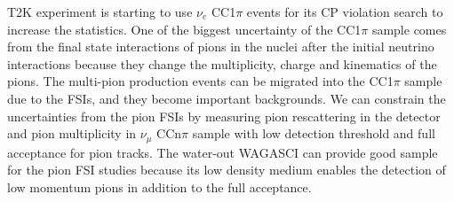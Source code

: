 T2K experiment is starting to use $\nu_{e}$ CC1$\pi$ events for its CP violation search to increase the statistics.
One of the biggest uncertainty of the CC1$\pi$ sample comes from the final state interactions of pions in the nuclei after the initial neutrino interactions because they change the multiplicity, charge and kinematics of the pions.
The multi-pion production events can be migrated into the CC1$\pi$ sample due to the FSIs, and they become important backgrounds.
We can constrain the uncertainties from the pion FSIs by measuring pion rescattering in the detector and pion multiplicity in $\nu_{\mu}$ CCn$\pi$ sample with low detection threshold and full acceptance for pion tracks.
The water-out WAGASCI can provide good sample for the pion FSI studies because its low density medium enables the detection of low momentum pions in addition to the full acceptance.

